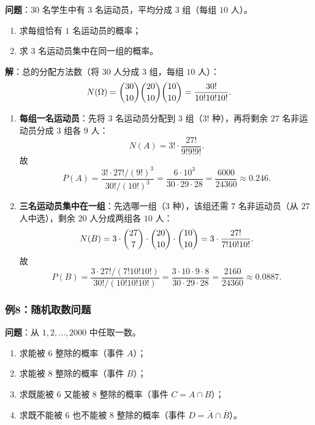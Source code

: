 \documentclass[11pt,a4paper]{report}
\theoremstyle{definition}
\begin{document}
\textbf{问题}：$30$ 名学生中有 $3$ 名运动员，平均分成 $3$ 组（每组 $10$ 人）。
\begin{enumerate}[label=(\arabic*),leftmargin=2em]
    \item 求每组恰有 $1$ 名运动员的概率；
    \item 求 $3$ 名运动员集中在同一组的概率。
\end{enumerate}

\textbf{解}：总的分配方法数（将 $30$ 人分成 $3$ 组，每组 $10$ 人）：
\[
N(\Omega) = \dbinom{30}{10}\dbinom{20}{10}\dbinom{10}{10} = \frac{30!}{10!10!10!}.
\]

\begin{enumerate}[label=(\arabic*),leftmargin=2em]
    \item \textbf{每组一名运动员}：先将 $3$ 名运动员分配到 $3$ 组（$3!$ 种），再将剩余 $27$ 名非运动员分成 $3$ 组各 $9$ 人：
    \[
    N(A) = 3! \cdot \frac{27!}{9!9!9!}.
    \]
    故
    \[
    P(A) = \frac{3! \cdot 27! / (9!)^3}{30! / (10!)^3} = \frac{6 \cdot 10^3}{30 \cdot 29 \cdot 28} = \frac{6000}{24360} \approx \boxed{0.246}.
    \]
    
    \item \textbf{三名运动员集中在一组}：先选哪一组（$3$ 种），该组还需 $7$ 名非运动员（从 $27$ 人中选），剩余 $20$ 人分成两组各 $10$ 人：
    \[
    N(B) = 3 \cdot \dbinom{27}{7} \cdot \dbinom{20}{10} \cdot \dbinom{10}{10} = 3 \cdot \frac{27!}{7!10!10!}.
    \]
    故
    \[
    P(B) = \frac{3 \cdot 27! / (7!10!10!)}{30! / (10!10!10!)} = \frac{3 \cdot 10 \cdot 9 \cdot 8}{30 \cdot 29 \cdot 28} = \frac{2160}{24360} \approx \boxed{0.0887}.
    \]
\end{enumerate}

\subsubsection{例8：随机取数问题}

\textbf{问题}：从 $1, 2, \dots, 2000$ 中任取一数。
\begin{enumerate}[label=(\arabic*),leftmargin=2em]
    \item 求能被 $6$ 整除的概率（事件 $A$）；
    \item 求能被 $8$ 整除的概率（事件 $B$）；
    \item 求既能被 $6$ 又能被 $8$ 整除的概率（事件 $C = A \cap B$）；
    \item 求既不能被 $6$ 也不能被 $8$ 整除的概率（事件 $D = \bar{A} \cap \bar{B}$）。
\end{enumerate}
\end{document}
